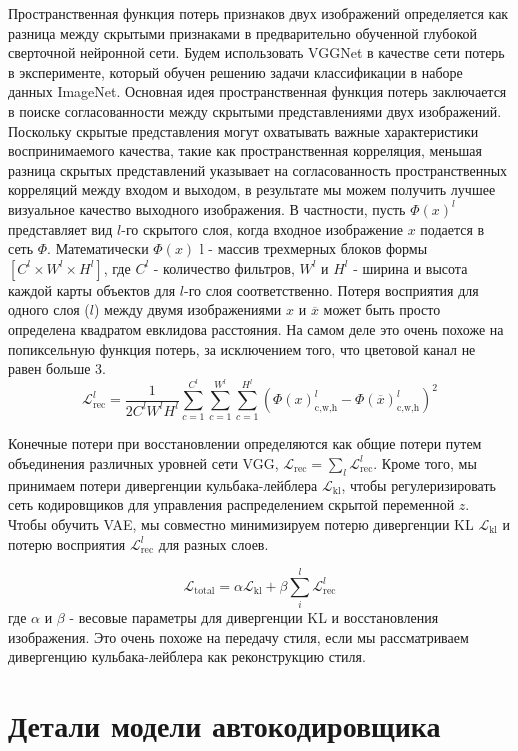Пространственная функция потерь признаков двух изображений определяется как разница между скрытыми признаками в предварительно обученной глубокой сверточной нейронной сети. Будем использовать VGGNet в качестве сети потерь в эксперименте, который обучен решению задачи классификации в наборе данных ImageNet. Основная идея пространственная функция потерь заключается в поиске согласованности между скрытыми представлениями двух изображений. Поскольку скрытые представления могут охватывать важные характеристики воспринимаемого качества, такие как пространственная корреляция, меньшая разница скрытых представлений указывает на согласованность пространственных корреляций между входом и выходом, в результате мы можем получить лучшее визуальное качество выходного изображения. В частности, пусть $\Phi(x)^l$ представляет вид $l$-го скрытого слоя, когда входное изображение $x$ подается в сеть $\Phi$. Математически $\Phi(x)$ l - массив трехмерных блоков формы $[C^l \times W^l \times H^l]$, где $C^l$ - количество фильтров, $W^l$ и $H^l$ - ширина и высота каждой карты объектов для $l$-го слоя соответственно. Потеря восприятия для одного слоя ($l$) между двумя изображениями $x$ и $\overline{x}$ может быть просто определена квадратом евклидова расстояния. На самом деле это очень похоже на попиксельную функция потерь, за исключением того, что цветовой канал не равен больше 3.
$$
 \mathcal{L}_{\text{rec}}^{l} = \frac{1}{2 C^l W^l H^l} \sum\limits_{c=1}^{C^l} \sum\limits_{c=1}^{W^l} \sum\limits_{c=1}^{H^l} (\Phi(x)_{\text{c,w,h}}^{l} - \Phi(\overline{x})_{\text{c,w,h}}^{l})^2
$$

Конечные потери при восстановлении определяются как общие потери путем объединения различных уровней сети VGG, $ \mathcal{L}_{\text{rec}} = \sum_{l} \mathcal{L}_{\text{rec}}^l$. Кроме того, мы принимаем потери дивергенции кульбака-лейблера $\mathcal{L}_{\text{kl}}$, чтобы регулеризировать сеть кодировщиков для управления распределением скрытой переменной $z$. Чтобы обучить VAE, мы совместно минимизируем потерю дивергенции KL $\mathcal{L}_{\text{kl}}$ и потерю восприятия $\mathcal{L}_{\text{rec}}^{l}$ для разных слоев.

$$
 \mathcal{L}_{\text{total}} = \alpha \mathcal{L}_{\text{kl}} + \beta \sum\limits_{i}^{l} \mathcal{L}_{\text{rec}}^l
$$
где $\alpha$ и $\beta$ - весовые параметры для дивергенции KL и восстановления изображения. Это очень похоже на передачу стиля, если мы рассматриваем дивергенцию кульбака-лейблера как реконструкцию стиля.

\section{Детали модели автокодировщика}

